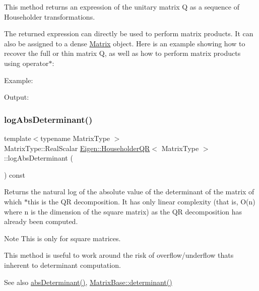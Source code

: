 This method returns an expression of the unitary matrix Q as a sequence of Householder transformations.

The returned expression can directly be used to perform matrix products. It can also be assigned to a dense \mbox{\hyperlink{class_eigen_1_1_matrix}{Matrix}} object. Here is an example showing how to recover the full or thin matrix Q, as well as how to perform matrix products using operator$\ast$\+:

Example\+: 
\begin{DoxyCodeInclude}{0}
\end{DoxyCodeInclude}
 Output\+: 
\begin{DoxyVerbInclude}
\end{DoxyVerbInclude}
 \mbox{\label{class_eigen_1_1_householder_q_r_af61b6dbef34fc51c825182b16dc43ca1}} 
\subsubsection{\texorpdfstring{logAbsDeterminant()}{logAbsDeterminant()}}
{\footnotesize\ttfamily template$<$typename Matrix\+Type $>$ \\
Matrix\+Type\+::\+Real\+Scalar \mbox{\hyperlink{class_eigen_1_1_householder_q_r}{Eigen\+::\+Householder\+QR}}$<$ Matrix\+Type $>$\+::log\+Abs\+Determinant (\begin{DoxyParamCaption}{ }\end{DoxyParamCaption}) const}

\begin{DoxyReturn}{Returns}
the natural log of the absolute value of the determinant of the matrix of which $\ast$this is the QR decomposition. It has only linear complexity (that is, O(n) where n is the dimension of the square matrix) as the QR decomposition has already been computed.
\end{DoxyReturn}
\begin{DoxyNote}{Note}
This is only for square matrices.

This method is useful to work around the risk of overflow/underflow that\textquotesingle{}s inherent to determinant computation.
\end{DoxyNote}
\begin{DoxySeeAlso}{See also}
\mbox{\hyperlink{class_eigen_1_1_householder_q_r_aaf4ef26c0b7affc91431ec59c92d64c3}{abs\+Determinant()}}, \mbox{\hyperlink{class_eigen_1_1_matrix_base_a7ad8f77004bb956b603bb43fd2e3c061}{Matrix\+Base\+::determinant()}} 
\end{DoxySeeAlso}
\mbox{\label{class_eigen_1_1_householder_q_r_ae837f2fb30099212c53b3042c7d699c9}} 
